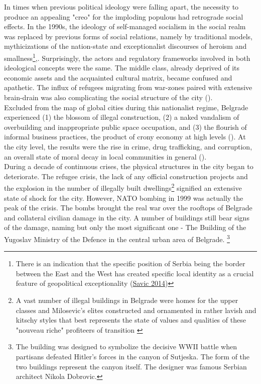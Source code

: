 \documentclass[11pt]{report}
\begin{document}
In times when previous political ideology were falling apart, the necessity to produce an appealing "creo" for the imploding populous had retrograde social effects.
In the 1990s, the ideology of self-managed socialism in the social realm was replaced by previous forms of social relations, namely by traditional models, mythicizations of the nation-state and exceptionalist discourses of heroism and smallness\footnote{There is an indication that the specific position of Serbia being the border between the East and the West has created specific local identity as a crucial feature of geopolitical exceptionality (\href{}{Savic 2014})}{\citealt{savic_where_2014}},\href{}{\citealt{doytchinov_belgrade_2015}}. 
Surprisingly, the actors and regulatory frameworks involved in both ideological concepts were the same.
The middle class, already deprived of its economic assets and the acquainted cultural matrix, became confused and apathetic.
The influx of refugees migrating from war-zones paired with extensive brain-drain was also complicating the social structure of the city (\href{}{\citealt{doytchinov_urban_2015}}).
\\

Excluded from the map of global cities during this nationalist regime, Belgrade experienced (1) the blossom of illegal construction, (2) a naked vandalism of overbuilding and inappropriate public space occupation, and (3) the flourish of informal business practices, the product of crony economy at high levels (\cite{ref}).
At the city level, the results were the rise in crime, drug trafficking, and corruption, an overall state of moral decay in local communities in general (\cite{Prodanovic Stariji i lepsi Beograd}).
\\
During a decade of continuous crises, the physical structures in the city began to deteriorate.
The refugee crisis, the lack of any official construction projects and the explosion in the number of illegally built dwellings\footnote{A vast number of illegal buildings in Belgrade were homes for the upper classes and Milosevic's elites constructed and ornamented in rather lavish and kitschy styles that best represents the state of values and qualities of these "nouveau riche" profiteers of transition \href{}{\citealt{hirt_belgrade_2009}}}
signified an extensive state of shock for the city.
However, NATO bombing in 1999 was actually the peak of the crisis. The bombs brought the real war over the rooftops of Belgrade and collateral civilian damage in the city.
A number of buildings still bear signs of the damage, naming but only the most significant one - The Building of the Yugoslav Ministry of the Defence in the central urban area of Belgrade.
\footnote{The building was designed to symbolize the decisive WWII battle when partisans defeated Hitler's forces in the canyon of Sutjeska. The form of the two buildings represent the canyon itself. The designer was famous Serbian architect Nikola Dobrovic.}
\\
\end{document}

